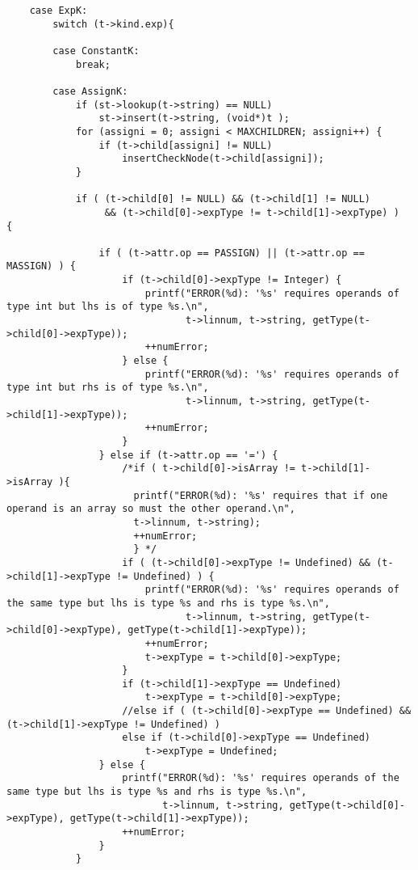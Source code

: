 \documentclass[12pt]{book}
\begin{document}
\begin{lstlisting}
    case ExpK:  
        switch (t->kind.exp){

        case ConstantK: 
            break;

        case AssignK:
            if (st->lookup(t->string) == NULL)   
                st->insert(t->string, (void*)t );   
            for (assigni = 0; assigni < MAXCHILDREN; assigni++) {
                if (t->child[assigni] != NULL)
                    insertCheckNode(t->child[assigni]);
            }

            if ( (t->child[0] != NULL) && (t->child[1] != NULL) 
                 && (t->child[0]->expType != t->child[1]->expType) )  {

                if ( (t->attr.op == PASSIGN) || (t->attr.op == MASSIGN) ) {
                    if (t->child[0]->expType != Integer) {
                        printf("ERROR(%d): '%s' requires operands of type int but lhs is of type %s.\n", 
                               t->linnum, t->string, getType(t->child[0]->expType));
                        ++numError;
                    } else {
                        printf("ERROR(%d): '%s' requires operands of type int but rhs is of type %s.\n", 
                               t->linnum, t->string, getType(t->child[1]->expType));
                        ++numError;
                    }
                } else if (t->attr.op == '=') {
                    /*if ( t->child[0]->isArray != t->child[1]->isArray ){
                      printf("ERROR(%d): '%s' requires that if one operand is an array so must the other operand.\n", 
                      t->linnum, t->string);
                      ++numError;
                      } */
                    if ( (t->child[0]->expType != Undefined) && (t->child[1]->expType != Undefined) ) {
                        printf("ERROR(%d): '%s' requires operands of the same type but lhs is type %s and rhs is type %s.\n", 
                               t->linnum, t->string, getType(t->child[0]->expType), getType(t->child[1]->expType));
                        ++numError;
                        t->expType = t->child[0]->expType; 
                    }
                    if (t->child[1]->expType == Undefined)
                        t->expType = t->child[0]->expType; 
                    //else if ( (t->child[0]->expType == Undefined) && (t->child[1]->expType != Undefined) )
                    else if (t->child[0]->expType == Undefined)
                        t->expType = Undefined; 
                } else { 
                    printf("ERROR(%d): '%s' requires operands of the same type but lhs is type %s and rhs is type %s.\n", 
                           t->linnum, t->string, getType(t->child[0]->expType), getType(t->child[1]->expType));
                    ++numError;
                }
            }


\end{lstlisting}
\end{document}
